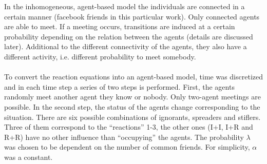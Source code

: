 In the inhomogeneous, agent-based model the individuals are connected in a certain manner (facebook friends in this particular work). Only connected agents are able to meet. If a meeting occurs, transitions are induced at a certain probability depending on the relation between the agents (details are discussed later). Additional to the different connectivity of the agents, they also have a different activity, i.e. different probability to meet somebody. 
\\
\\
To convert the reaction equations into an agent-based model, time was discretized and in each time step a series of two steps is performed. First, the agents randomly meet another agent they know or nobody. Only two-agent meetings are possible. In the second step, the status of the agents change corresponding to the situation. There are six possible combinations of ignorants, spreaders and stiflers. Three of them correspond to the ``reactions'' 1-3, the other ones (I+I, I+R and R+R) have no other influence than ``occupying'' the agents. The probability $\lambda$ was chosen to be dependent on the number of common friends. For simplicity, $\alpha$ was a constant.